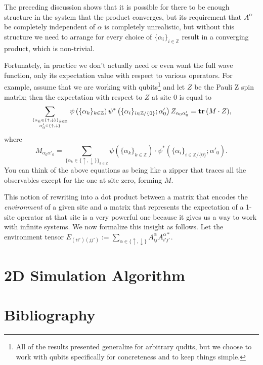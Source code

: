 \documentclass{article}
\newcommand{\paren}[1]{\left(#1\right)}
\newcommand{\tr}{\text{\textbf{tr}}\,}
\newcommand{\Z}{\mathbb{Z}}
\begin{document}
The preceding discussion shows that it is possible for there to be enough structure in the system that the product converges, but its requirement that $A^\alpha$ be completely independent of $\alpha$ is completely unrealistic, but without this structure we need to arrange for every choice of $\{\alpha_i\}_{i\in\Z}$ result in a converging product, which is non-trivial.

Fortunately, in practice we don't actually need or even want the full wave function, only its expectation value with respect to various operators.  For example, assume that we are working with qubits\footnote{All of the results presented generalize for arbitrary qudits, but we choose to work with qubits specifically for concreteness and to keep things simple.} and let $Z$ be the Pauli Z spin matrix;  then the expectation with respect to $Z$ at site 0 is equal to
$$\sum_{\{\alpha_k\in\{\uparrow,\downarrow\}\}_{k\in\Z}\atop\alpha'_0\in\{\uparrow,\downarrow\}}\psi\paren{\{\alpha_k\}_{k\in\Z}}\psi^*\paren{\{\alpha_i\}_{i\in\Z/\{0\}};\alpha'_0} Z_{\alpha_0\alpha'_0}=\tr(M\cdot Z),$$ where $$M_{\alpha_0\alpha'_0}=\sum_{\{\alpha_k\in\{\uparrow,\downarrow\}\}_{k\in\Z}}\psi\paren{\{\alpha_k\}_{k\in\Z}}\cdot\psi^*\paren{\{\alpha_i\}_{i\in\Z/\{0\}};\alpha'_0}.$$
You can think of the above equations as being like a zipper that traces all the observables except for the one at site zero, forming $M$.

This notion of rewriting into a dot product between a matrix that encodes the \emph{environment} of a given site and a matrix that represents the expectation of a 1-site operator at that site is a very powerful one because it gives us a way to work with infinite systems.  We now formalize this insight as follows.  Let the environment tensor $E_{(ii')(jj')}:=\sum_{\alpha\in\{\uparrow,\downarrow\}}A^\alpha_{ij}A^{\alpha*}_{i'j'}.$

\part{2D Simulation Algorithm}
\label{2dsim}

\part*{Bibliography}



\end{document}
